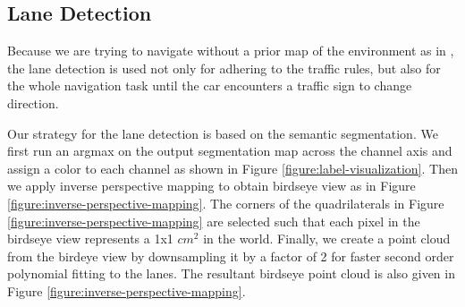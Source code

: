 \subsection{Lane Detection}

Because we are trying to navigate without a prior map of the environment as in
\cite{cite9}, the lane detection is used not only for adhering to the traffic
rules, but also for the whole navigation task until the car encounters a
traffic sign to change direction.

Our strategy for the lane detection is based on the semantic segmentation. We
first run an argmax on the output segmentation map across the channel axis and
assign a color to each channel as shown in Figure
\ref{figure:label-visualization}. Then we apply inverse perspective mapping to
obtain birdseye view as in Figure \ref{figure:inverse-perspective-mapping}.
The corners of the quadrilaterals in Figure
\ref{figure:inverse-perspective-mapping} are selected such that each pixel in
the birdseye view represents a 1x1 $cm^2$ in the world. Finally, we create a
point cloud from the birdeye view by downsampling it by a factor of 2 for
faster second order polynomial fitting to the lanes. The resultant birdseye
point cloud is also given in Figure \ref{figure:inverse-perspective-mapping}.

